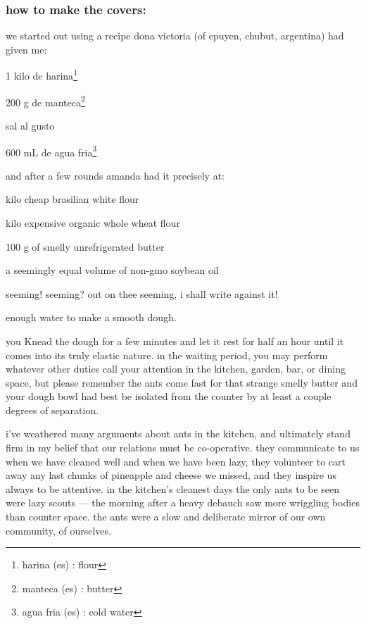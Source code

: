 \subsubsection{how to make the covers:}

we started out using a recipe dona victoria (of epuyen, chubut,
argentina) had given me:

\begin{ingredients}
  \item 1 kilo de harina\footnote{harina (es) : flour}
  \item 200 g de manteca\footnote{manteca (es) : butter}
  \item sal al gusto
  \item 600 mL de agua fria\footnote{agua fria (es) : cold water}
\end{ingredients}

and after a few rounds amanda had it precisely at:

\begin{ingredients}
  \item \onehalf kilo cheap brasilian white flour
  \item \onehalf kilo expensive organic whole wheat flour
  \item 100 g of smelly unrefrigerated butter
  \item a seemingly equal volume of non-gmo soybean oil
\end{ingredients}

seeming! seeming? out on thee seeming, i shall write against it!

\begin{ingredients}
  \item enough water to make a smooth dough.
\end{ingredients}

you Knead the dough for a few minutes and let it rest for half an hour
until it comes into its truly elastic nature. in the waiting period,
you may perform whatever other duties call your attention in the
kitchen, garden, bar, or dining space, but please remember the ants
come fast for that strange smelly butter and your dough bowl had best
be isolated from the counter by at least a couple degrees of
separation.

i've weathered many arguments about ants in the kitchen, and
ultimately stand firm in my belief that our relations must be
co-operative. they communicate to us when we have cleaned well and
when we have been lazy, they volunteer to cart away any last chunks of
pineapple and cheese we missed, and they inspire us always to be
attentive. in the kitchen's cleanest days the only ants to be seen
were lazy scouts --- the morning after a heavy debauch saw more
wriggling bodies than counter space. the ants were a slow and
deliberate mirror of our own community, of ourselves.

